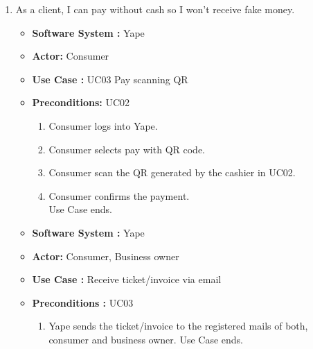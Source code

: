 \documentclass{article}
\begin{document}
\begin{enumerate}
    
   \item  As a client, I can pay without cash so I won't receive fake money. 
   \begin{itemize}
        \item \textbf{Software System : } Yape 
        \item \textbf{Actor: } Consumer 
        \item \textbf{Use Case : } UC03 Pay scanning QR
        \item \textbf{Preconditions: } UC02
	\begin{enumerate}
            \item Consumer logs into Yape.
	    \item Consumer selects pay with QR code.
	    \item Consumer scan the QR generated by the cashier in UC02.
	    \item Consumer confirms the payment.\\
            Use Case ends.
        \end{enumerate}
    \end{itemize}

 
   \begin{itemize}
        \item \textbf{Software System :} Yape 
        \item \textbf{Actor: } Consumer, Business owner
        \item \textbf{Use Case : } Receive ticket/invoice via email
        \item \textbf{Preconditions : } UC03
	\begin{enumerate}
            \item Yape sends the ticket/invoice to the registered mails of both, consumer and business owner.
            Use Case ends.
       \end{enumerate}
    \end{itemize}
    
    
\end{enumerate}
\end{document}
